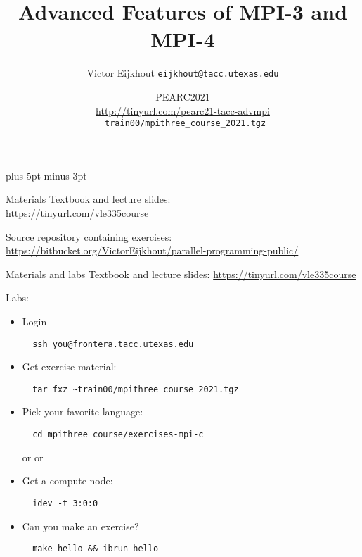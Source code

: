 \documentclass[11pt,headernav]{beamer}
\newcounter{tacc}
\def\Location{}%
\def\courseyear{2021}
\def\Location{TACC APP institute MPI training \courseyear}
\def\Location{TACC/XSEDE MPI training \courseyear}
\def\Location{ISS 2021}
\def\Location{PEARC2021\\
  \small
  \url{http://tinyurl.com/pearc21-tacc-advmpi}\\
  \texttt{\char126 train00/mpithree\_course\_2021.tgz}
}
\newcounter{mpithree}
\begin{document}
\parskip=10pt plus 5pt minus 3pt

\title{Advanced Features of MPI-3 and MPI-4}
\author{Victor Eijkhout {\tt eijkhout@tacc.utexas.edu}}
\date{\Location}

\begin{frame}
  \titlepage
\end{frame}

\begin{xsede}
  
\end{xsede}

\begin{download}
  \begin{frame}[containsverbatim]{Materials}
    Textbook and lecture slides:\\
    \url{https://tinyurl.com/vle335course}
    
    Source repository containing exercises: \\
    \url{https://bitbucket.org/VictorEijkhout/parallel-programming-public/}
  \end{frame}
\end{download}

\begin{lab}
  \begin{frame}[containsverbatim]{Materials and labs}
    Textbook and lecture slides: \url{https://tinyurl.com/vle335course}

    Labs:
    \begin{itemize}
    \item Login
\begin{verbatim}
  ssh you@frontera.tacc.utexas.edu
\end{verbatim}

\item Get exercise material:\\
\begin{verbatim}
  tar fxz ~train00/mpithree_course_2021.tgz
\end{verbatim}

\item Pick your favorite language:\\
\begin{verbatim}
  cd mpithree_course/exercises-mpi-c
\end{verbatim}
  or  or 
\item Get a compute node:
\begin{verbatim}
  idev -t 3:0:0
\end{verbatim}

\item Can you make an exercise?\\
\begin{verbatim}
  make hello && ibrun hello
\end{verbatim}

    \end{itemize}
  \end{frame}
\end{lab}
\end{document}
